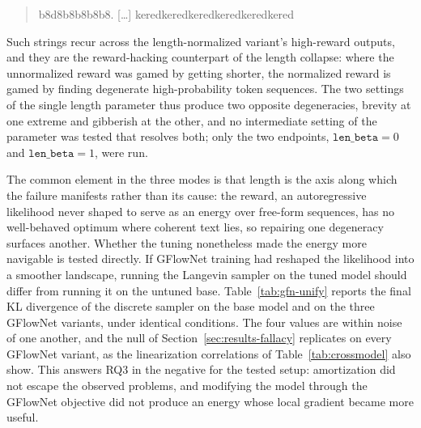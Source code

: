\begin{quote}
\ttfamily b8d8b8b8b8b8. [\ldots] keredkeredkeredkeredkeredkered
\end{quote}

Such strings recur across the length-normalized variant's high-reward outputs, and they are the reward-hacking counterpart of the length collapse: where the unnormalized reward was gamed by getting shorter, the normalized reward is gamed by finding degenerate high-probability token sequences.
The two settings of the single length parameter thus produce two opposite degeneracies, brevity at one extreme and gibberish at the other, and no intermediate setting of the parameter was tested that resolves both; only the two endpoints, $\texttt{len\_beta}=0$ and $\texttt{len\_beta}=1$, were run.

The common element in the three modes is that length is the axis along which the failure manifests rather than its cause: the reward, an autoregressive likelihood never shaped to serve as an energy over free-form sequences, has no well-behaved optimum where coherent text lies, so repairing one degeneracy surfaces another. Whether the tuning nonetheless made the energy more navigable is tested directly. If GFlowNet training had reshaped the likelihood into a smoother landscape, running the Langevin sampler on the tuned model should differ from running it on the untuned base. Table~\ref{tab:gfn-unify} reports the final KL divergence of the discrete sampler on the base model and on the three GFlowNet variants, under identical conditions.
The four values are within noise of one another, and the null of Section~\ref{sec:results-fallacy} replicates on every GFlowNet variant, as the linearization correlations of Table~\ref{tab:crossmodel} also show. This answers RQ3 in the negative for the tested setup: amortization did not escape the observed problems, and modifying the model through the GFlowNet objective did not produce an energy whose local gradient became more useful.

